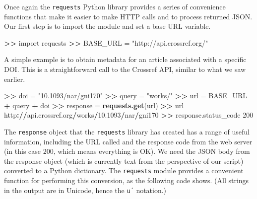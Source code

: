 \documentclass[]{krantz}
\newenvironment{Shaded}{\begin{snugshade}}{\end{snugshade}}
\newcommand{\KeywordTok}[1]{\textcolor[rgb]{0.13,0.29,0.53}{\textbf{#1}}}
\newcommand{\DecValTok}[1]{\textcolor[rgb]{0.00,0.00,0.81}{#1}}
\newcommand{\FloatTok}[1]{\textcolor[rgb]{0.00,0.00,0.81}{#1}}
\newcommand{\StringTok}[1]{\textcolor[rgb]{0.31,0.60,0.02}{#1}}
\newcommand{\OperatorTok}[1]{\textcolor[rgb]{0.81,0.36,0.00}{\textbf{#1}}}
\newcommand{\ErrorTok}[1]{\textcolor[rgb]{0.64,0.00,0.00}{\textbf{#1}}}
\newcommand{\NormalTok}[1]{#1}
\begin{document}
Once again the \texttt{requests} Python library provides a series of
convenience functions that make it easier to make HTTP calls and to
process returned JSON. Our first step is to import the module and set a
base URL variable.

\begin{Shaded}
\begin{Highlighting}[]
\OperatorTok{>}\ErrorTok{>}\StringTok{ }\NormalTok{import requests}
\OperatorTok{>}\ErrorTok{>}\StringTok{ }\NormalTok{BASE_URL =}\StringTok{ "http://api.crossref.org/"}
\end{Highlighting}
\end{Shaded}

A simple example is to obtain metadata for an article associated with a
specific DOI. This is a straightforward call to the Crossref API,
similar to what we saw earlier.

\begin{Shaded}
\begin{Highlighting}[]
\OperatorTok{>}\ErrorTok{>}\StringTok{ }\NormalTok{doi =}\StringTok{ "10.1093/nar/gni170"}
\OperatorTok{>}\ErrorTok{>}\StringTok{ }\NormalTok{query =}\StringTok{ "works/"}
\OperatorTok{>}\ErrorTok{>}\StringTok{ }\NormalTok{url =}\StringTok{ }\NormalTok{BASE_URL }\OperatorTok{+}\StringTok{ }\NormalTok{query }\OperatorTok{+}\StringTok{ }\NormalTok{doi}
\OperatorTok{>}\ErrorTok{>}\StringTok{ }\NormalTok{response =}\StringTok{ }\KeywordTok{requests.get}\NormalTok{(url)}
\OperatorTok{>}\ErrorTok{>}\StringTok{ }\NormalTok{url}
\NormalTok{http}\OperatorTok{:}\ErrorTok{//}\NormalTok{api.crossref.org}\OperatorTok{/}\NormalTok{works}\OperatorTok{/}\FloatTok{10.1093}\OperatorTok{/}\NormalTok{nar}\OperatorTok{/}\NormalTok{gni170}
\OperatorTok{>}\ErrorTok{>}\StringTok{ }\NormalTok{response.status_code}
\DecValTok{200}
\end{Highlighting}
\end{Shaded}

The \texttt{response} object that the \texttt{requests} library has
created has a range of useful information, including the URL called and
the response code from the web server (in this case 200, which means
everything is OK). We need the JSON body from the response object (which
is currently text from the perspective of our script) converted to a
Python dictionary. The \texttt{requests} module provides a convenient
function for performing this conversion, as the following code shows.
(All strings in the output are in Unicode, hence the \texttt{u´}
notation.)
\end{document}
